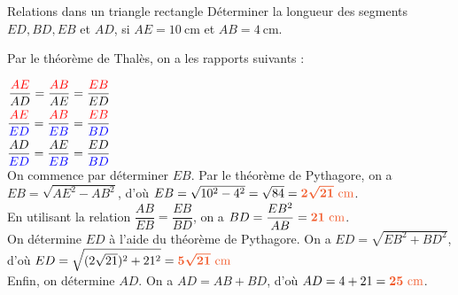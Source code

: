 \documentclass{beamer}
\begin{document}
\begin{frame}{Relations dans un triangle rectangle}
  Déterminer la longueur des segments $ED, BD, EB$ et $AD$, si $AE = 10~\text{cm}$ et $AB = 4~\text{cm}$.

  \begin{center}
\end{center}
\end{frame}
\begin{frame}
Par le théorème de Thalès, on a les rapports suivants : 
      

\medskip

$\begin{aligned}    
\dfrac{{\color{red} AE}}{{\color{black} AD}} = \dfrac{{\color{red} AB}}{{\color{black} AE}} = \dfrac{{\color{red} EB}}{{\color{black} ED}}\\
\dfrac{{\color{red} AE}}{{\color{blue} ED}} = \dfrac{{\color{red} AB}}{{\color{blue} EB}} = \dfrac{{\color{red} EB}}{{\color{blue} BD}}\\
\dfrac{{\color{black} AD}}{{\color{blue} ED}} = \dfrac{{\color{black} AE}}{{\color{blue} EB}} = \dfrac{{\color{black} ED}}{{\color{blue} BD}}
\end{aligned}$\\
\medskip
          On commence par déterminer $EB$. Par le théorème de Pythagore, on a $EB = \sqrt{AE^2 - AB^2}$, d'où $EB = \sqrt{10^2 - 4^2} = \sqrt{84} = {\color[HTML]{f15929}\boldsymbol{2\sqrt{21}~\text{cm}}}$.
          \\En utilisant la relation $\dfrac{AB}{EB}=\dfrac{EB}{BD}$, on a $BD= \dfrac{EB^2}{AB}={\color[HTML]{f15929}\boldsymbol{21~\text{cm}}}$.
          \\ On détermine $ED$ à l'aide du théorème de Pythagore. On a $ED=\sqrt{EB^2+BD^2}$, d'où $ED=\sqrt{(2\sqrt{21})^2+21^2}={\color[HTML]{f15929}\boldsymbol{5\sqrt{21}~\text{cm}}}$
          \\ Enfin, on détermine $AD$. On a $AD = AB + BD$, d'où $AD = 4 + 21 = {\color[HTML]{f15929}\boldsymbol{25~\text{cm}}}$.
\end{frame}
\end{document}
